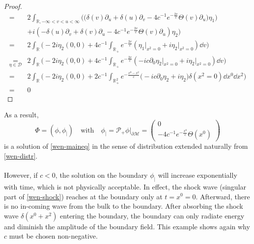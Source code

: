 \begin{proof}
\begin{equation*}
\begin{split}
%
= &2 \int_{\mathbb{R}, -\infty<v<u <\infty}\Big( \big(\delta(v) \partial_u + \delta(u)\partial_v -4c^{-1}e^{-\frac{2v}{c}}\Theta(v)\partial_u)\eta_1 \big)\\
&+ i (-\delta(u)\partial_v + \delta(v)\partial_u-4c^{-1}e^{-\frac{2v}{c}}\Theta(v)\partial_u)\eta_2
\Big)\\ 
%
=& 2\int_{\mathbb{R}}\Big( -2i\eta_2 (0,0) + 4c^{-1}\int_{\mathbb{R}_+}e^{-\frac{2v}{c} }(\eta_1\vert_{x^2 = 0} +i \eta_2\vert_{x^2 = 0}) \dd v\Big) \\ 
%
\underset{\eta\in \mathcal{D}} =& 2\int_{\mathbb{R}}\Big( -2i\eta_2 (0,0) + 4c^{-1}\int_{\mathbb{R}_+}e^{-\frac{2v}{c} }(-ic \partial_0\eta_2\vert_{x^2 = 0} +i\eta_2\vert_{x^2 = 0}) \dd v\Big) \\ 
% 
=& 2\int_{\mathbb{R}}\Big( -2i\eta_2 (0,0) + 2c^{-1}\int_{\mathbb{R}^2_+}e^{-\frac{x^0-x^2} {c} }\big(-ic \partial_0\eta_2 +i\eta_2\big)\delta(x^2 = 0) \dd x^0 \dd x^2\Big) \\ 
=& 0
\end{split}
\end{equation*}
\end{proof}
As a result, 
\begin{equation*}\Phi = (\phi, \phi_|) \quad \mathrm{with}\quad \phi_| = \mathcal{P}_+ \phi\vert_{\partial \mathcal{M}} = 
\begin{pmatrix} 0 \\ -4c^{-1}e^{- \frac{x^0}{c}} \Theta(x^0) \end{pmatrix}
\end{equation*}
 is a solution of \cref{wen-maineq} in the sense of distribution extended naturally from \cref{wen-distr}. \\\\
However, if $c<0$, the solution on the boundary $\phi_|$ will increase exponentially with time, which is not physically acceptable. 
In effect, the shock wave (singular part of \cref{wen-shock}) reaches at the boundary only at $t = x^0 = 0$.
Afterward, there is no in-coming wave from the bulk to the boundary. 
After absorbing the shock wave $\delta(x^0+x^2)$ entering the boundary,
the boundary can only radiate energy and diminish the amplitude of the boundary field. 
This example shows again why $c$ must be chosen non-negative.












